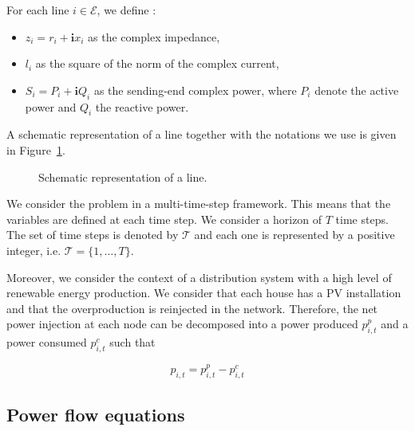 For each line $i \in \mathcal{E}$, we define :
\begin{itemize}
  \item $z_i = r_i + \mathbf{i}x_i$ as the complex impedance,
  \item $l_i$ as the square of the norm of the complex current,
  \item $S_i = P_i + \mathbf{i}Q_i$ as the sending-end complex power, where $P_i$ denote the active power and $Q_i$ the reactive power.
\end{itemize}

A schematic representation of a line together with the notations we use is given in Figure~\ref{fig:line}.

\begin{figure}
  \begin{center}
  \caption{Schematic representation of a line.}
  \label{fig:line}
  \end{center}
\end{figure}

We consider the problem in a multi-time-step framework.
This means that the variables are defined at each time step.
We consider a horizon of $T$ time steps.
The set of time steps is denoted by $\mathcal{T}$ and each one is represented by a positive integer, i.e. $\mathcal{T} = \{1, \dots, T\}$.

Moreover, we consider the context of a distribution system with a high level of renewable energy production.
We consider that each house has a PV installation and that the overproduction is reinjected in the network.
Therefore, the net power injection at each node can be decomposed into a power produced $p_{i,t}^p$ and a power consumed $p_{i,t}^c$ such that

\[ p_{i,t} = p_{i,t}^p - p_{i,t}^c \]

\subsection{Power flow equations}

